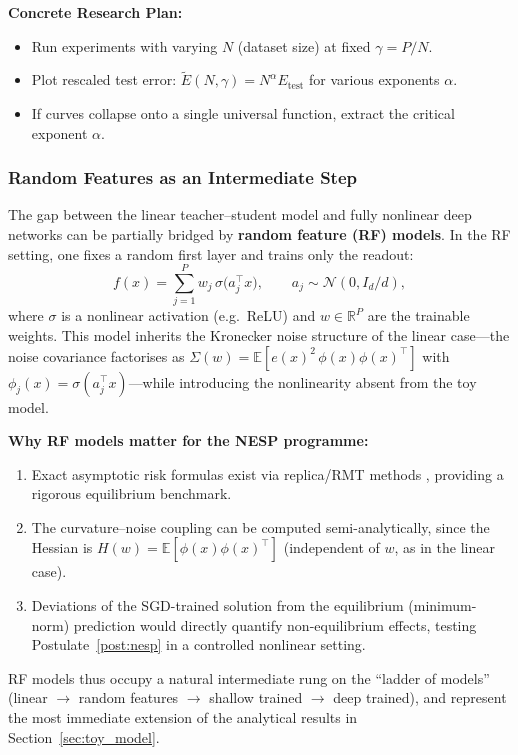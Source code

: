 \documentclass[
  journal=largetwo,
  year=2025,
  volume=37,
]{cup-journal}
\begin{document}
\textbf{Concrete Research Plan:}
\begin{itemize}
    \item Run experiments with varying $N$ (dataset size) at fixed $\gamma = P/N$.
    \item Plot rescaled test error: $\tilde{E}(N, \gamma) = N^{\alpha} E_{\text{test}}$ for various exponents $\alpha$.
    \item If curves collapse onto a single universal function, extract the critical exponent $\alpha$.
\end{itemize}

\subsubsection{Random Features as an Intermediate Step}

The gap between the linear teacher--student model and fully nonlinear deep networks can be partially bridged by \textbf{random feature (RF) models}. In the RF setting, one fixes a random first layer and trains only the readout:
\begin{equation}
    f(x) = \sum_{j=1}^{P} w_j \,\sigma\!\bigl(a_j^\top x\bigr), \qquad a_j \sim \mathcal{N}(0, I_d/d),
\end{equation}
where $\sigma$ is a nonlinear activation (e.g.\ ReLU) and $w \in \mathbb{R}^P$ are the trainable weights. This model inherits the Kronecker noise structure of the linear case---the noise covariance factorises as $\Sigma(w) = \mathbb{E}[e(x)^2\,\phi(x)\phi(x)^\top]$ with $\phi_j(x) = \sigma(a_j^\top x)$---while introducing the nonlinearity absent from the toy model.

\textbf{Why RF models matter for the NESP programme:}
\begin{enumerate}
    \item Exact asymptotic risk formulas exist via replica/RMT methods \cite{mei2020generalizationerrorrandomfeatures}, providing a rigorous equilibrium benchmark.
    \item The curvature--noise coupling can be computed semi-analytically, since the Hessian is $H(w) = \mathbb{E}[\phi(x)\phi(x)^\top]$ (independent of $w$, as in the linear case).
    \item Deviations of the SGD-trained solution from the equilibrium (minimum-norm) prediction would directly quantify non-equilibrium effects, testing Postulate~\ref{post:nesp} in a controlled nonlinear setting.
\end{enumerate}
RF models thus occupy a natural intermediate rung on the ``ladder of models'' (linear $\to$ random features $\to$ shallow trained $\to$ deep trained), and represent the most immediate extension of the analytical results in Section~\ref{sec:toy_model}.
\end{document}
